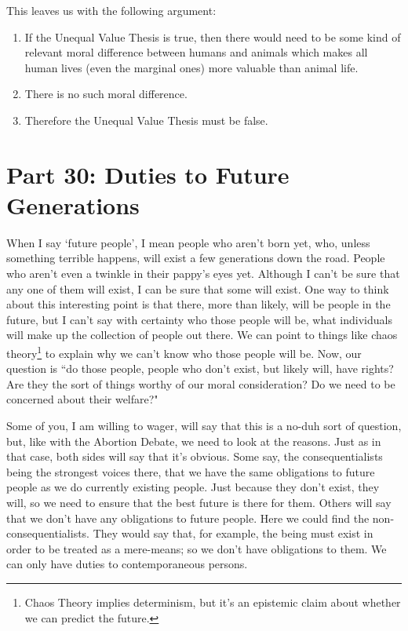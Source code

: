This leaves us with the following argument: 

\begin{enumerate}
\item If the Unequal Value Thesis is true, then there would need to be some kind of relevant moral difference between humans and animals which makes all human lives (even the marginal ones) more valuable than animal life. 
\item There is no such moral difference. 
\item Therefore the Unequal Value Thesis must be false. 
\end{enumerate}

\chapter{Part 30: Duties to Future Generations}
When I say ‘future people’, I mean people who aren’t born yet, who, unless something terrible happens, will exist a few generations down the road. People who aren’t even a twinkle in their pappy’s eyes yet. Although I can’t be sure that any one of them will exist, I can be sure that some will exist. One way to think about this interesting point is that there, more than  likely, will be people in the future, but I can't say with certainty who those people will be, what individuals will make up the collection of people out there. We can point to things like chaos theory\footnote{Chaos Theory implies determinism, but it's an epistemic claim about whether we can predict the future.} to explain why we can't know who those people will be.  Now, our question is ``do those people, people who don't exist, but likely will, have rights? Are they the sort of things worthy of our moral consideration? Do we need to be concerned about their welfare?"

Some of you, I am willing to wager, will say that this is a no-duh sort of question, but, like with the Abortion Debate, we need to look at the reasons. Just as in that case, both sides will say that it's obvious. Some say, the consequentialists being the strongest voices there, that we have the same obligations to future people as we do currently existing people. Just because they don't exist, they will, so we need to ensure that the best future is there for them. Others will say that we don't have any obligations to future people. Here we could find the non-consequentialists. They would say that, for example, the being must exist in order to be treated as a mere-means; so we don't have obligations to them. We can only have duties to contemporaneous persons.

